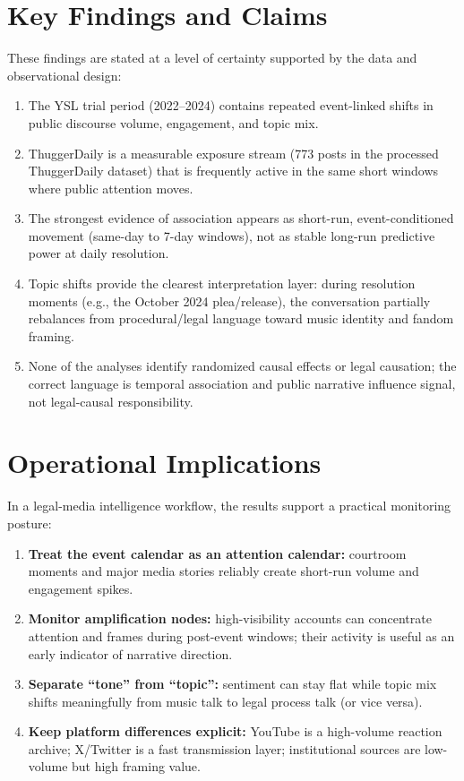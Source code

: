 \documentclass[12pt]{article}
\begin{document}
\section{Key Findings and Claims}
These findings are stated at a level of certainty supported by the data and observational design:
\begin{enumerate}[leftmargin=*]
\item The YSL trial period (2022--2024) contains repeated event-linked shifts in public discourse volume, engagement, and topic mix.
\item ThuggerDaily is a measurable exposure stream (773 posts in the processed ThuggerDaily dataset) that is frequently active in the same short windows where public attention moves.
\item The strongest evidence of association appears as short-run, event-conditioned movement (same-day to 7-day windows), not as stable long-run predictive power at daily resolution.
\item Topic shifts provide the clearest interpretation layer: during resolution moments (e.g., the October 2024 plea/release), the conversation partially rebalances from procedural/legal language toward music identity and fandom framing.
\item None of the analyses identify randomized causal effects or legal causation; the correct language is temporal association and public narrative influence signal, not legal-causal responsibility.
\end{enumerate}

\section{Operational Implications}
In a legal-media intelligence workflow, the results support a practical monitoring posture:
\begin{enumerate}[leftmargin=*]
\item \textbf{Treat the event calendar as an attention calendar:} courtroom moments and major media stories reliably create short-run volume and engagement spikes.
\item \textbf{Monitor amplification nodes:} high-visibility accounts can concentrate attention and frames during post-event windows; their activity is useful as an early indicator of narrative direction.
\item \textbf{Separate ``tone'' from ``topic'':} sentiment can stay flat while topic mix shifts meaningfully from music talk to legal process talk (or vice versa).
\item \textbf{Keep platform differences explicit:} YouTube is a high-volume reaction archive; X/Twitter is a fast transmission layer; institutional sources are low-volume but high framing value.
\end{enumerate}
\end{document}
